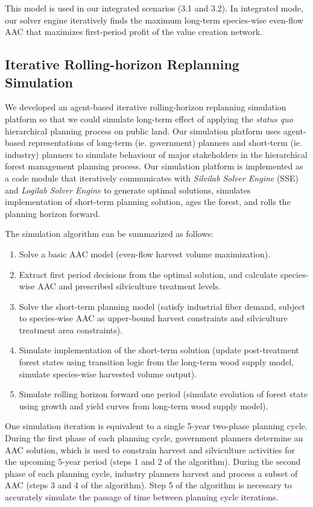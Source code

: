 This model is used in our integrated scenarios (3.1 and 3.2). In
integrated mode, our solver engine iteratively finds the maximum
long-term species-wise even-flow AAC that maximizes first-period
profit of the value creation network. 


\subsection{Iterative Rolling-horizon Replanning Simulation}

We developed an agent-based iterative rolling-horizon replanning
simulation platform so that we could simulate long-term effect of
applying the \emph{status quo} hierarchical planning process on public
land. Our simulation platform uses agent-based representations of
long-term (ie. government) planners and short-term (ie. industry)
planners to simulate behaviour of major stakeholders in the
hierarchical forest management planning process. Our simulation
platform is implemented as a code module that iteratively communicates
with \emph{Silvilab Solver Engine} (SSE) and \emph{Logilab Solver
  Engine} \citep{jerbi2012optimization} %
to generate optimal solutions, simulates implementation of short-term
planning solution, ages the forest, and rolls the planning horizon
forward. 

The simulation algorithm can be summarized as follows:
\begin{enumerate}
\item Solve a basic AAC model (even-flow harvest volume maximization).
\item Extract first period decisions from the optimal solution, and calculate
species-wise AAC and prescribed silviculture treatment levels.
\item Solve the short-term planning model (satisfy industrial fiber
  demand, subject to species-wise AAC as upper-bound harvest
  constraints and silviculture treatment area constraints).
\item Simulate implementation of the short-term solution (update
  post-treatment forest states using transition logic from the long-term
  wood supply model, simulate species-wise harvested volume output).
\item Simulate rolling horizon forward one period (simulate evolution
  of forest state using growth and yield curves from long-term wood
  supply model).
\end{enumerate}

One simulation iteration is equivalent to a single 5-year two-phase
planning cycle. During the first phase of each planning cycle,
government planners determine an AAC solution, which is used to
constrain harvest and silviculture activities for the upcoming 5-year
period (steps 1 and 2 of the algorithm). During the second phase of
each planning cycle, industry planners harvest and process a subset of
AAC (steps 3 and 4 of the algorithm). Step 5 of the algorithm is
necessary to accurately simulate the passage of time between planning
cycle iterations.

